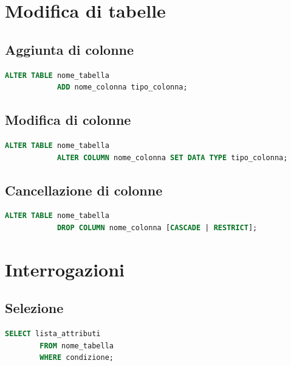 \documentclass[12pt, a4paper]{report}
\begin{document}
    \section{Modifica di tabelle}
    \subsection{Aggiunta di colonne}
    \begin{lstlisting}[language=SQL]
        ALTER TABLE nome_tabella
            ADD nome_colonna tipo_colonna;
    \end{lstlisting}
    \subsection{Modifica di colonne}
    \begin{lstlisting}[language=SQL]
        ALTER TABLE nome_tabella
            ALTER COLUMN nome_colonna SET DATA TYPE tipo_colonna;
    \end{lstlisting}
    \subsection{Cancellazione di colonne}
    \begin{lstlisting}[language=SQL]
        ALTER TABLE nome_tabella
            DROP COLUMN nome_colonna [CASCADE | RESTRICT];
    \end{lstlisting}
    \section{Interrogazioni}
    \subsection{Selezione}
    \begin{lstlisting}[language=SQL]
        SELECT lista_attributi
        FROM nome_tabella
        WHERE condizione;
    \end{lstlisting}
\end{document}
